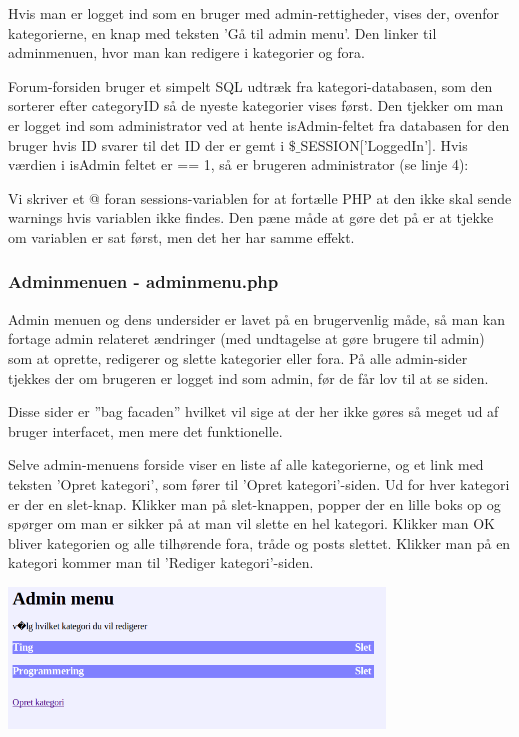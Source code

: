 \documentclass{article}
\begin{document}
Hvis man er logget ind som en bruger med admin-rettigheder, vises der, ovenfor kategorierne, en knap med teksten 'Gå til admin menu'. Den linker til adminmenuen, hvor man kan redigere i kategorier og fora.

Forum-forsiden bruger et simpelt SQL udtræk fra kategori-databasen, som den sorterer efter categoryID så de nyeste kategorier vises først. Den tjekker om man er logget ind som administrator ved at hente isAdmin-feltet fra databasen for den bruger hvis ID svarer til det ID der er gemt i $\$$$\_$SESSION['LoggedIn']. Hvis værdien i isAdmin feltet er == 1, så er brugeren administrator (se linje 4):



Vi skriver et @ foran sessions-variablen for at fortælle PHP at den ikke skal sende warnings hvis variablen ikke findes. Den pæne måde at gøre det på er at tjekke om variablen er sat først, men det her har samme effekt.

\subsubsection[Adminmenuen]{Adminmenuen - adminmenu.php}
Admin menuen og dens undersider er lavet på en brugervenlig måde, så man kan fortage admin relateret ændringer (med undtagelse at gøre brugere til admin) som at oprette, redigerer og slette kategorier eller fora. På alle admin-sider tjekkes der om brugeren er logget ind som admin, før de får lov til at se siden.

Disse sider er ”bag facaden” hvilket vil sige at der her ikke gøres så meget ud af bruger interfacet, men mere det funktionelle.

Selve admin-menuens forside viser en liste af alle kategorierne, og et link med teksten 'Opret kategori', som fører til 'Opret kategori'-siden. Ud for hver kategori er der en slet-knap. Klikker man på slet-knappen, popper der en lille boks op og spørger om man er sikker på at man vil slette en hel kategori. Klikker man OK bliver kategorien og alle tilhørende fora, tråde og posts slettet. Klikker man på en kategori kommer man til 'Rediger kategori'-siden. 

\includegraphics[width=100mm]{mi01.png}
\end{document}
